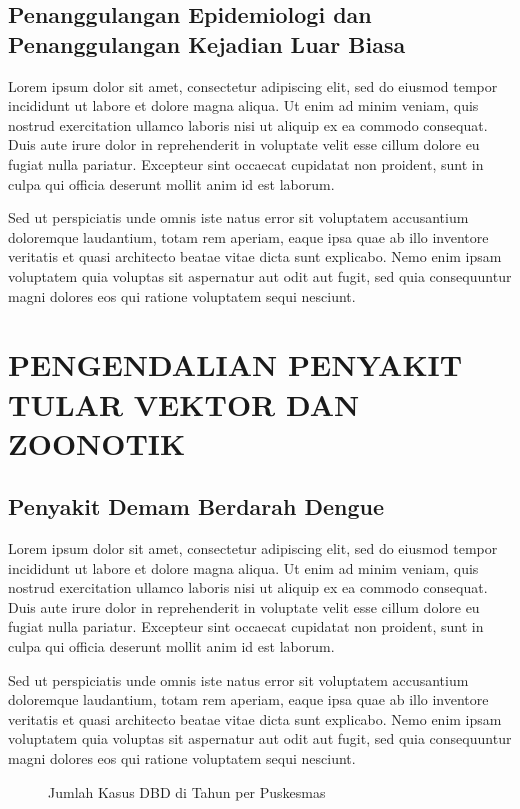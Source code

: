 \subsection{Penanggulangan Epidemiologi dan Penanggulangan Kejadian Luar Biasa}
Lorem ipsum dolor sit amet, consectetur adipiscing elit, sed do eiusmod tempor incididunt ut labore et dolore magna aliqua. Ut enim ad minim veniam, quis nostrud exercitation ullamco laboris nisi ut aliquip ex ea commodo consequat. Duis aute irure dolor in reprehenderit in voluptate velit esse cillum dolore eu fugiat nulla pariatur. Excepteur sint occaecat cupidatat non proident, sunt in culpa qui officia deserunt mollit anim id est laborum.

Sed ut perspiciatis unde omnis iste natus error sit voluptatem accusantium doloremque laudantium, totam rem aperiam, eaque ipsa quae ab illo inventore veritatis et quasi architecto beatae vitae dicta sunt explicabo. Nemo enim ipsam voluptatem quia voluptas sit aspernatur aut odit aut fugit, sed quia consequuntur magni dolores eos qui ratione voluptatem sequi nesciunt.

\section[PENGENDALIAN PTVZ]{PENGENDALIAN PENYAKIT TULAR VEKTOR DAN ZOONOTIK}
\subsection{Penyakit Demam Berdarah Dengue}
Lorem ipsum dolor sit amet, consectetur adipiscing elit, sed do eiusmod tempor incididunt ut labore et dolore magna aliqua. Ut enim ad minim veniam, quis nostrud exercitation ullamco laboris nisi ut aliquip ex ea commodo consequat. Duis aute irure dolor in reprehenderit in voluptate velit esse cillum dolore eu fugiat nulla pariatur. Excepteur sint occaecat cupidatat non proident, sunt in culpa qui officia deserunt mollit anim id est laborum.

Sed ut perspiciatis unde omnis iste natus error sit voluptatem accusantium doloremque laudantium, totam rem aperiam, eaque ipsa quae ab illo inventore veritatis et quasi architecto beatae vitae dicta sunt explicabo. Nemo enim ipsam voluptatem quia voluptas sit aspernatur aut odit aut fugit, sed quia consequuntur magni dolores eos qui ratione voluptatem sequi nesciunt.

\begin{figure}[H]
	\centering
	\caption{Jumlah Kasus DBD di \namaKabupaten Tahun \tP per Puskesmas}
	\label{fig:Jumlah-Kasus-DBD}
\end{figure}

